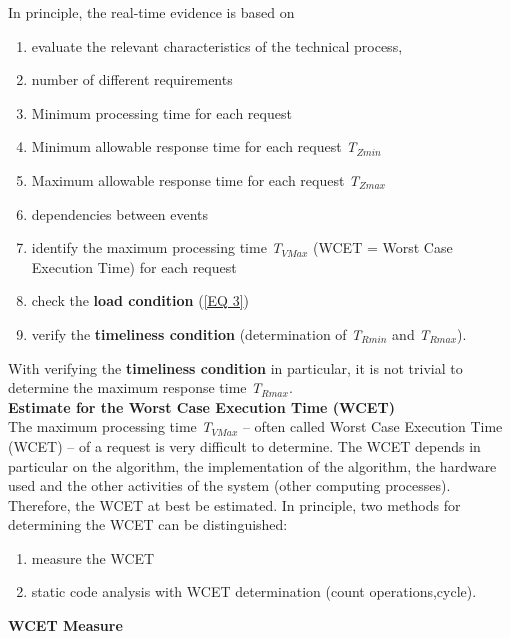 In principle, the real-time evidence is based on

\begin{enumerate}
	\item  evaluate the relevant characteristics of the technical process,
	\item  number of different requirements
	\item  Minimum processing time for each request
	\item  Minimum allowable response time for each request \textit{T${}_{Zmin}$}
	\item  Maximum allowable response time for each request \textit{T${}_{Zmax}$}
	\item  dependencies between events
	\item  identify the maximum processing time \textit{T${}_{VMax}$} (WCET = Worst Case Execution Time) for each request
	\item  check the\textbf{ load condition} (\ref{EQ 3})
	\item  verify the \textbf{timeliness condition} (determination of \textit{T${}_{Rmin}$} and \textit{T${}_{Rmax}$}).
\end{enumerate}

With verifying the \textbf{timeliness condition} in particular, it is not trivial to determine the maximum response time \textit{T${}_{Rmax}$}.\\

{\rot\bf Estimate for the Worst Case Execution Time (WCET)}\\

The maximum processing time \textit{T${}_{VMax}$} -- often called Worst Case Execution Time (WCET) -- of a request is very difficult to determine. The WCET depends in particular on the algorithm, the implementation of the algorithm, the hardware used and the other activities of the system (other computing processes). \\

Therefore, the WCET at best be estimated. In principle, two methods for determining the WCET can be distinguished:

\begin{enumerate}
	\item  measure the WCET 
	\item  static code analysis with WCET determination (count operations,cycle).
\end{enumerate}

{\rot\bf WCET Measure}\\

